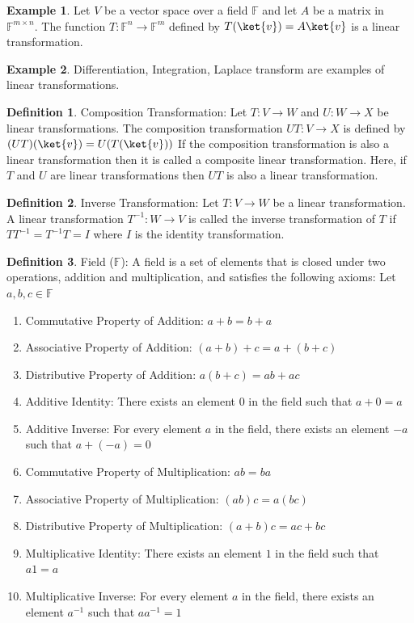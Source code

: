 \documentclass[12pt, oneside]{book}
\theoremstyle{definition}
\newtheorem{definition}{Definition}[section]
\theoremstyle{definition}
\newtheorem{example}{Example}[section]
\theoremstyle{remark}
\begin{document}
\begin{example}
    Let $V$ be a vector space over a field $\mathbb{F}$ and let $A$ be a matrix in $\mathbb{F}^{m\times n}$. The function $T:\mathbb{F}^{n}\rightarrow\mathbb{F}^{m}$ defined by $T(\ket{v})=A\ket{v}$ is a linear transformation.
\end{example}

\begin{example}
    Differentiation, Integration, Laplace transform are examples of linear transformations.
\end{example}

\begin{definition}
    Composition Transformation: Let $T:V\rightarrow W$ and $U:W\rightarrow X$ be linear transformations. The composition transformation $UT:V\rightarrow X$ is defined by $(UT)(\ket{v})=U(T(\ket{v}))$
    If the composition transformation is also a linear transformation then it is called a composite linear transformation. Here, if $T$ and $U$ are linear transformations then $UT$ is also a linear transformation.
\end{definition}

\begin{definition}
    Inverse Transformation: Let $T:V\rightarrow W$ be a linear transformation. A linear transformation $T^{-1}:W\rightarrow V$ is called the inverse transformation of $T$ if $TT^{-1}=T^{-1}T=I$ where $I$ is the identity transformation.
\end{definition}

\begin{definition}
    Field ($\mathbb{F}$): A field is a set of elements that is closed under two operations, addition and multiplication, and satisfies the following axioms:
    Let $a,b,c\in\mathbb{F}$
    \begin{enumerate}
        \item Commutative Property of Addition: $a+b=b+a$
        \item Associative Property of Addition: $(a+b)+c=a+(b+c)$
        \item Distributive Property of Addition: $a(b+c)=ab+ac$
        \item Additive Identity: There exists an element $0$ in the field such that $a+0=a$
        \item Additive Inverse: For every element $a$ in the field, there exists an element $-a$ such that $a+(-a)=0$
        \item Commutative Property of Multiplication: $ab=ba$
        \item Associative Property of Multiplication: $(ab)c=a(bc)$
        \item Distributive Property of Multiplication: $(a+b)c=ac+bc$
        \item Multiplicative Identity: There exists an element $1$ in the field such that $a1=a$
        \item Multiplicative Inverse: For every element $a$ in the field, there exists an element $a^{-1}$ such that $aa^{-1}=1$
    \end{enumerate}
\end{definition}
\end{document}
